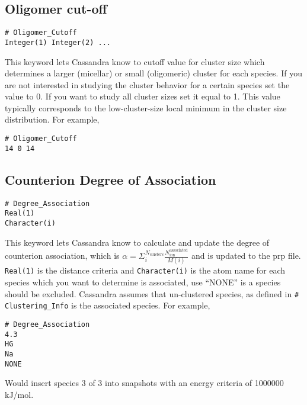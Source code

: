 \documentclass[12pt,twoside]{article}
\begin{document}
\subsection{Oligomer cut-off}
\begin{verbatim}
# Oligomer_Cutoff
Integer(1) Integer(2) ...
\end{verbatim}
This keyword lets Cassandra know to cutoff value for cluster size which determines a larger (micellar) or small (oligomeric) cluster for each species.  If you are not interested in studying the cluster behavior for a certain species set the value to 0.  If you want to study all cluster sizes set it equal to 1.  This value typically corresponds to the low-cluster-size local minimum in the cluster size distribution.
\newline\noindent For example,
\begin{verbatim}
# Oligomer_Cutoff
14 0 14
\end{verbatim}

\subsection{Counterion Degree of Association}
\begin{verbatim}
# Degree_Association
Real(1)
Character(i) 
\end{verbatim}
This keyword lets Cassandra know to calculate and update the degree of counterion association, which is $\alpha = \Sigma_{i}^{N_{\text{clusters}}}\frac{N_{\text{ion}}^{\text{associated}}}{M(i)}$ and is updated to the prp file.  \texttt{Real(1)} is the distance criteria and \texttt{Character(i)} is the atom name for each species which you want to determine is associated, use ``NONE'' is a species should be excluded.  Cassandra assumes that un-clustered species, as defined in \texttt{\# Clustering\_Info} is the associated species.
\newline\noindent For example,
\begin{verbatim}
# Degree_Association
4.3
HG  
Na   
NONE
\end{verbatim}
Would insert species 3 of 3 into snapshots with an energy criteria of 1000000 kJ/mol.
\end{document}
